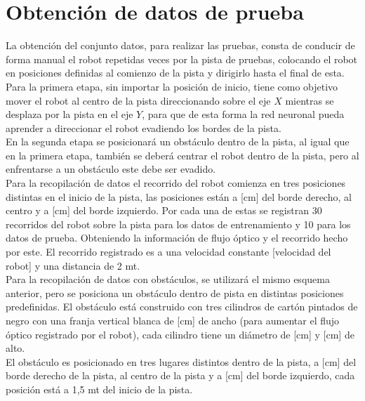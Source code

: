 \documentclass{iccmemoria}
\begin{document}
\section{Obtención de datos de prueba}
 
La obtención del conjunto datos, para realizar las pruebas, consta de conducir de forma manual el robot repetidas veces por la pista de pruebas, colocando el robot en posiciones definidas al comienzo de la pista y dirigirlo hasta el final de esta.\\
 
Para la primera etapa, sin importar la posición de inicio, tiene como objetivo mover el robot al centro de la pista direccionando sobre el eje $X$ mientras se desplaza por la pista en el eje $Y$, para que de esta forma la red neuronal pueda aprender a direccionar el robot evadiendo los bordes de la pista.\\
 
En la segunda etapa se posicionará un obstáculo dentro de la pista, al igual que en la primera etapa, también se deberá centrar el robot dentro de la pista, pero al enfrentarse a un obstáculo este debe ser evadido.\\

Para la recopilación de datos el recorrido del robot comienza en tres posiciones distintas en el inicio de la pista, las posiciones están a [cm] del borde derecho, al centro y a [cm] del borde izquierdo. Por cada una de estas se registran 30 recorridos del robot sobre la pista para los datos de entrenamiento y 10 para los datos de prueba. Obteniendo la información de flujo óptico y el recorrido hecho por este. El recorrido registrado es a una velocidad constante [velocidad del robot] y una distancia de 2 mt.\\
 
Para la recopilación de datos con obstáculos, se utilizará el mismo esquema anterior, pero se posiciona un obstáculo dentro de pista en distintas posiciones predefinidas. El obstáculo está construido con tres cilindros de cartón pintados de negro con una franja vertical blanca de [cm] de ancho (para aumentar el flujo óptico registrado por el robot), cada cilindro tiene un diámetro de [cm] y [cm] de alto.\\

El obstáculo es posicionado en tres lugares distintos dentro de la pista, a [cm] del borde derecho de la pista, al centro de la pista y a [cm] del borde izquierdo, cada posición está a 1,5 mt del inicio de la pista.\\
\end{document}
